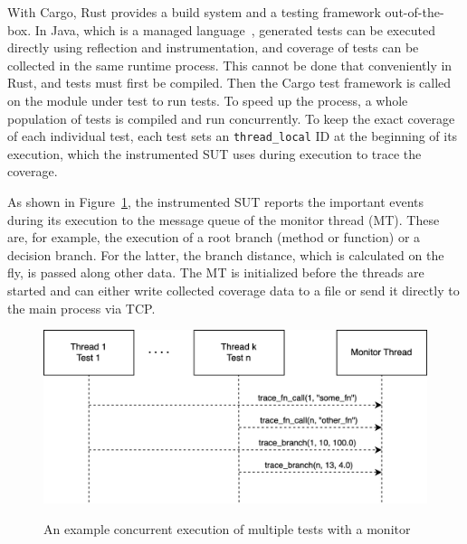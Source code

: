 \documentclass{article}
\begin{document}
With Cargo, Rust provides a build system and a testing framework out-of-the-box. In Java, which is a managed language~\cite{Gough2005}, generated tests can be executed directly using reflection and instrumentation, and coverage of tests can be collected in the same runtime process. This cannot be done that conveniently in Rust, and tests must first be compiled. Then the Cargo test framework is called on the module under test to run tests. To speed up the process, a whole population of tests is compiled and run concurrently. To keep the exact coverage of each individual test, each test sets an \lstinline{thread_local} ID at the beginning of its execution, which the instrumented \ac{SUT} uses during execution to trace the coverage. 


As shown in Figure~\ref{fig:test-execution}, the instrumented \ac{SUT} reports the important events during its execution to the message queue of the monitor thread (MT). These are, for example, the execution of a root branch (method or function) or a decision branch. For the latter, the branch distance, which is calculated on the fly, is passed along other data. The MT is initialized before the threads are started and can either write collected coverage data to a file or send it directly to the main process via TCP.

\begin{figure}[h]
\caption{An example concurrent execution of multiple tests with a monitor}
\centering
\includegraphics[width=\textwidth]{test-execution}
\label{fig:test-execution}
\end{figure}
\end{document}
